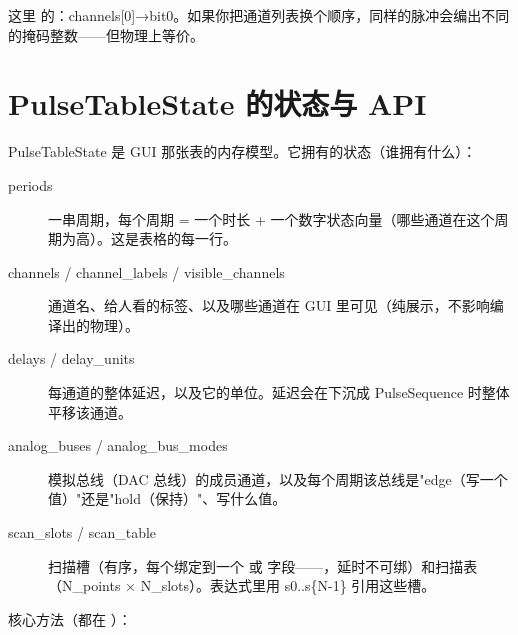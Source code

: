 \documentclass[11pt,oneside,openany]{book}
\begin{document}
这里  的：channels[0]→bit0。如果你把通道列表换个顺序，同样的脉冲会编出不同的掩码整数——但物理上等价。

\section{PulseTableState 的状态与 API}

PulseTableState 是 GUI 那张表的内存模型。它拥有的状态（谁拥有什么）：

\begin{description}
\item[periods] 一串周期，每个周期 = 一个时长 + 一个数字状态向量（哪些通道在这个周期为高）。这是表格的每一行。
\item[channels / channel\_labels / visible\_channels] 通道名、给人看的标签、以及哪些通道在 GUI 里可见（纯展示，不影响编译出的物理）。
\item[delays / delay\_units] 每通道的整体延迟，以及它的单位。延迟会在下沉成 PulseSequence 时整体平移该通道。
\item[analog\_buses / analog\_bus\_modes] 模拟总线（DAC 总线）的成员通道，以及每个周期该总线是"edge（写一个值）"还是"hold（保持）"、写什么值。
\item[scan\_slots / scan\_table] 扫描槽（有序，每个绑定到一个  或  字段——，延时不可绑）和扫描表（N\_points × N\_slots）。表达式里用 s0..s\{N-1\} 引用这些槽。
\end{description}

核心方法（都在 ）：
\end{document}

